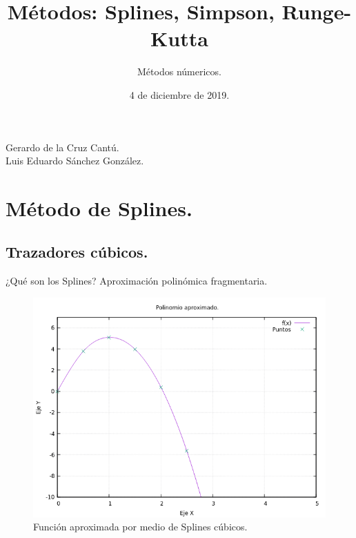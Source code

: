 \documentclass[12pt]{beamer}
\author{Métodos númericos.}
\title{Métodos: Splines, Simpson, Runge-Kutta}
\institute{Facultad de Ciencias Físico Matemáticas, UAdeC.}
\date{4 de diciembre de 2019. }
\begin{document}
\begin{frame}
\titlepage
Gerardo de la Cruz Cantú. \\ Luis Eduardo Sánchez González.
\end{frame}

\begin{frame}
\tableofcontents
\end{frame}

\section{Método de Splines.}
\subsection{Trazadores cúbicos.}
\begin{frame}{¿Qué son los Splines?}
Aproximación polinómica fragmentaria.
\begin{figure}
\centering
\includegraphics[scale=0.4]{spline.png}
\caption{Función aproximada por medio de Splines cúbicos.} 
\end{figure}
\end{frame}
\end{document}
